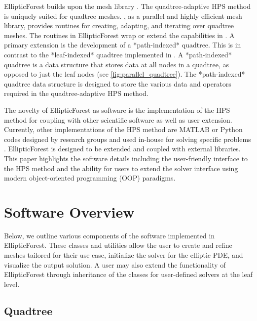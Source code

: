 EllipticForest builds upon the  mesh library \citep{burstedde2011p4est}. The quadtree-adaptive HPS method is uniquely suited for quadtree meshes. , as a parallel and highly efficient mesh library, provides routines for creating, adapting, and iterating over quadtree meshes. The routines in EllipticForest wrap or extend the capabilities in . A primary extension is the development of a *path-indexed* quadtree. This is in contrast to the *leaf-indexed* quadtree implemented in . A *path-indexed* quadtree is a data structure that stores data at all nodes in a quadtree, as opposed to just the leaf nodes (see \autoref{fig:parallel_quadtree}). The *path-indexed* quadtree data structure is designed to store the various data and operators required in the quadtree-adaptive HPS method.

The novelty of EllipticForest as software is the implementation of the HPS method for coupling with other scientific software as well as user extension. Currently, other implementations of the HPS method are MATLAB or Python codes designed by research groups and used in-house for solving specific problems \citep{ultraSEM, HPS_Demos, Streamer_HPS}. EllipticForest is designed to be extended and coupled with external libraries. This paper highlights the software details including the user-friendly interface to the HPS method and the ability for users to extend the solver interface using modern object-oriented programming (OOP) paradigms.

\section{Software Overview}

Below, we outline various components of the software implemented in EllipticForest. These classes and utilities allow the user to create and refine meshes tailored for their use case, initialize the solver for the elliptic PDE, and visualize the output solution. A user may also extend the functionality of EllipticForest through inheritance of the  classes for user-defined solvers at the leaf level.

\subsection{Quadtree}

